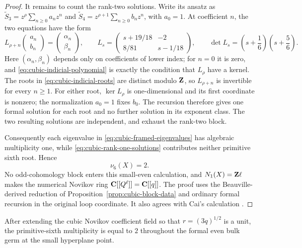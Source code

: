 \begin{proof}
It remains to count the rank-two solutions.  Write its ansatz as
\(\widetilde S_3=z^\rho\sum_{n\ge0}a_nz^n\) and
\(\widetilde S_4=z^{\rho+1}\sum_{n\ge0}b_nz^n\), with \(a_0=1\).
At coefficient \(n\), the two equations have the form
\[
 L_{\rho+n}\begin{pmatrix}a_n\\b_n\end{pmatrix}
 =\begin{pmatrix}\alpha_n\\\beta_n\end{pmatrix},
 \qquad
 L_s=
 \begin{pmatrix}
 s+19/18&-2\\
 8/81&s-1/18
 \end{pmatrix},
 \qquad
 \det L_s=\left(s+\frac16\right)\left(s+\frac56\right).
 \label{eq:cubic-frobenius-recursion}
\]
Here \((\alpha_n,\beta_n)\) depends only on coefficients of lower index;
for \(n=0\) it is zero, and \eqref{eq:cubic-indicial-polynomial} is exactly
the condition that \(L_\rho\) have a kernel.  The roots in
\eqref{eq:cubic-indicial-roots} are distinct modulo \(\mathbf Z\), so
\(L_{\rho+n}\) is invertible for every \(n\ge1\).  For either root,
\(\ker L_\rho\) is one-dimensional and its first coordinate is nonzero;
the normalization \(a_0=1\) fixes \(b_0\).  The recursion therefore gives
one formal solution for each root and no further solution in its exponent
class.  The two resulting solutions are independent, and exhaust the
rank-two block.

Consequently each eigenvalue in \eqref{eq:cubic-framed-eigenvalues} has
algebraic multiplicity one, while
\eqref{eq:cubic-rank-one-solutions} contributes neither primitive sixth root.
Hence
\[
 \nu_6(X)=2.
 \label{eq:cubic-packet-internal-count}
\]
No odd-cohomology block enters this small-even calculation, and
\(N_1(X)=\mathbf Z\ell\) makes the numerical Novikov ring
\(\mathbf C[[Q^\ell]]=\mathbf C[[q]]\).  The proof uses the Beauville-derived reduction of
Proposition~\ref{prop:cubic-block-data} and ordinary formal recursion in the
  original loop coordinate.  It also agrees with Cai's calculation
\cite[pp.~5--6]{Cai}.

\end{proof}

\begin{corollary}
\label{cor:cubic-formal-germ}
%
%
After extending the cubic Novikov coefficient field so that
$r=(3q)^{1/2}$ is a unit, the primitive-sixth multiplicity is equal to $2$
throughout the formal even bulk germ at the small hyperplane point.
\end{corollary}


